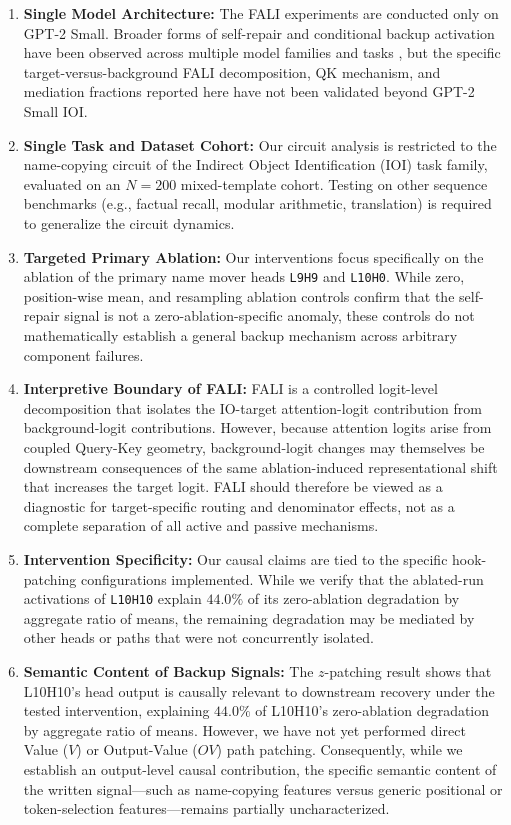 \documentclass[10pt]{article} %
\begin{document}
\begin{enumerate}
  \item \textbf{Single Model Architecture:} The FALI experiments are conducted only on GPT-2 Small. Broader forms of self-repair and conditional backup activation have been observed across multiple model families and tasks \citep{rushing2024selfrepair,gong2026conditional}, but the specific target-versus-background FALI decomposition, QK mechanism, and mediation fractions reported here have not been validated beyond GPT-2 Small IOI.
  \item \textbf{Single Task and Dataset Cohort:} Our circuit analysis is restricted to the name-copying circuit of the Indirect Object Identification (IOI) task family, evaluated on an $N=200$ mixed-template cohort. Testing on other sequence benchmarks (e.g., factual recall, modular arithmetic, translation) is required to generalize the circuit dynamics.
  \item \textbf{Targeted Primary Ablation:} Our interventions focus specifically on the ablation of the primary name mover heads \texttt{L9H9} and \texttt{L10H0}. While zero, position-wise mean, and resampling ablation controls confirm that the self-repair signal is not a zero-ablation-specific anomaly, these controls do not mathematically establish a general backup mechanism across arbitrary component failures.
  \item \textbf{Interpretive Boundary of FALI:} FALI is a controlled logit-level decomposition that isolates the IO-target attention-logit contribution from background-logit contributions. However, because attention logits arise from coupled Query-Key geometry, background-logit changes may themselves be downstream consequences of the same ablation-induced representational shift that increases the target logit. FALI should therefore be viewed as a diagnostic for target-specific routing and denominator effects, not as a complete separation of all active and passive mechanisms.
  \item \textbf{Intervention Specificity:} Our causal claims are tied to the specific hook-patching configurations implemented. While we verify that the ablated-run activations of \texttt{L10H10} explain $44.0\%$ of its zero-ablation degradation by aggregate ratio of means, the remaining degradation may be mediated by other heads or paths that were not concurrently isolated.
  \item \textbf{Semantic Content of Backup Signals:} The $z$-patching result shows that L10H10's head output is causally relevant to downstream recovery under the tested intervention, explaining $44.0\%$ of L10H10's zero-ablation degradation by aggregate ratio of means. However, we have not yet performed direct Value ($V$) or Output-Value ($OV$) path patching. Consequently, while we establish an output-level causal contribution, the specific semantic content of the written signal---such as name-copying features versus generic positional or token-selection features---remains partially uncharacterized.
\end{enumerate}
\end{document}
